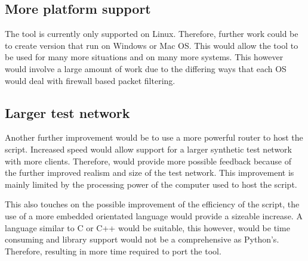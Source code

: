 \subsection{More platform support}
The tool is currently only supported on Linux. Therefore, further work could be to create version that run on Windows or Mac OS. This would allow the tool to be used for many more situations and on many more systems. This however would involve a large amount of work due to the differing ways that each OS would deal with firewall based packet filtering.


\subsection{Larger test network}
Another further improvement would be to use a more powerful router to host the script. Increased speed would allow support for a larger synthetic test network with more clients. Therefore, would provide more possible feedback because of the further improved realism and size of the test network. This improvement is mainly limited by the processing power of the computer used to host the script. 

This also touches on the possible improvement of the efficiency of the script, the use of a more embedded orientated language would provide a sizeable increase. A language similar to C or C++ would be suitable, this however, would be time consuming and library support would not be a comprehensive as Python's. Therefore, resulting in more time required to port the tool.